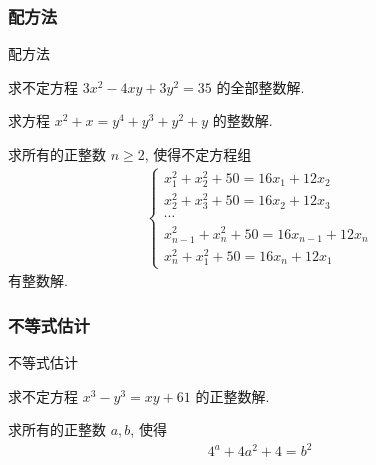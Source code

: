 \documentclass[aspectratio=169]{ctexbeamer}
\theoremstyle{definition}
\begin{document}
\subsubsection*{配方法}

\begin{frame}[t]{配方法}
	\begin{example}
		求不定方程 $3 x^{2}-4 x y+3 y^{2}=35$ 的全部整数解.
	\end{example}
\end{frame}

\begin{frame}[t]
	\begin{example}
		求方程 $x^{2}+x=y^{4}+y^{3}+y^{2}+y$ 的整数解.
	\end{example}
\end{frame}

\begin{frame}[t]
	\begin{example}
		求所有的正整数 $n \geqslant 2$, 使得不定方程组
		\begin{align*}
			\left\{\begin{array}{c}
				       x_{1}^{2}+x_{2}^{2}+50=16 x_{1}+12 x_{2}     \\
				       x_{2}^{2}+x_{3}^{2}+50=16 x_{2}+12 x_{3}     \\
				       \cdots                                       \\
				       x_{n-1}^{2}+x_{n}^{2}+50=16 x_{n-1}+12 x_{n} \\
				       x_{n}^{2}+x_{1}^{2}+50=16 x_{n}+12 x_{1}
			       \end{array}\right.
		\end{align*}
		有整数解.
	\end{example}
\end{frame}


\subsubsection*{不等式估计}

\begin{frame}[t]{不等式估计}
	\begin{example}
		求不定方程 $x^{3}-y^{3}=x y+61$ 的正整数解.
	\end{example}
\end{frame}

\begin{frame}[t]
	\begin{example}
		求所有的正整数 $a ,  b$, 使得
		\begin{align*}
			4^{a}+4 a^{2}+4=b^{2}
		\end{align*}
	\end{example}
\end{frame}
\end{document}
